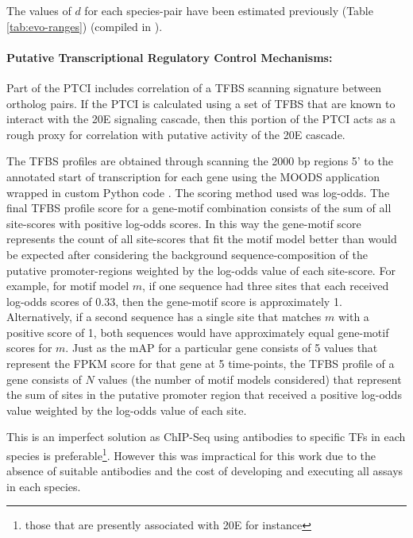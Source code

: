 The values of $d$ for each species-pair have been estimated previously (Table \ref{tab:evo-ranges}) (compiled in \citet{Sieglaff2009}).




\paragraph*{Putative Transcriptional Regulatory Control Mechanisms:}

Part of the \gls{PTCI} includes correlation of a \gls{TFBS} scanning signature between ortholog pairs.
If the \gls{PTCI} is calculated using a set of \gls{TFBS} that are known to interact with the \gls{20E} signaling cascade, then this portion of the \gls{PTCI} acts as a rough proxy for correlation with putative activity of the \gls{20E} cascade.

The \gls{TFBS} profiles are obtained through scanning the 2000 bp regions 5' to the annotated start of transcription for each gene using the \gls{MOODS} application wrapped in custom Python code \cite{Pizzi2009}.
The scoring method used was log-odds.
The final \gls{TFBS} profile score for a gene-motif combination consists of the sum of all site-scores with positive log-odds scores.
In this way the gene-motif score represents the count of all site-scores that fit the motif model better than would be expected after considering the background sequence-composition of the putative promoter-regions weighted by the log-odds value of each site-score.
For example, for motif model $m$, if one sequence had three sites that each received log-odds scores of 0.33, then the gene-motif score is approximately 1.
Alternatively, if a second sequence has a single site that matches $m$ with a positive score of 1, both sequences would have approximately equal gene-motif scores for $m$.
Just as the \gls{mAP} for a particular gene consists of 5 values that represent the \gls{FPKM} score for that gene at 5 time-points, the \gls{TFBS} profile of a gene consists of $N$ values (the number of motif models considered) that represent the sum of sites in the putative promoter region that received a positive log-odds value weighted by the log-odds value of each site.

This is an imperfect solution as \gls{ChIP-Seq} using antibodies to specific \glspl{TF} in each species is preferable\footnote{those that are presently associated with \gls{20E} for instance}.
However this was impractical for this work due to the absence of suitable antibodies and the cost of developing and executing all assays in each species.



